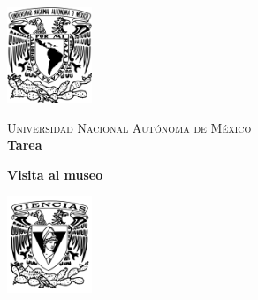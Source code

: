 \documentclass{report}
\begin{document}
    \begin{minipage}[t]{0.165 \textwidth}
       \begin{flushright}
        \includegraphics[width=1in]{EscudoUNAM.png}
       \end{flushright}
    \end{minipage}
    \begin{minipage}[H]{0.62 \textwidth}
        \begin{center}
            {\large \textsc{Universidad Nacional Autónoma de México}}
            \vspace{0.25cm}
            \\
            { \huge \textbf{Tarea}}
            \\
            \vspace{0.25cm}
            
            \textbf{Visita al museo}
	    \\
	    \vspace{0.25cm}
            \vspace{0.2cm}
        \end{center}
        \vspace{0.05cm}
    \end{minipage}
    \begin{minipage}[t]{0.165 \textwidth}
        \begin{flushleft}
            \includegraphics[width=1in]{Fciencias_UNAM.png}
        \end{flushleft}
    \end{minipage}

\end{document}
